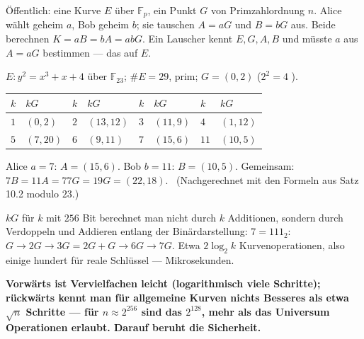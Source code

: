 \begin{merksatz}
Öffentlich: eine Kurve $E$ über $\mathbb F_p$, ein Punkt $G$ von Primzahlordnung $n$. Alice wählt geheim $a$, Bob geheim $b$; sie tauschen $A = aG$ und $B = bG$ aus. Beide berechnen $K = aB = bA = abG$. Ein Lauscher kennt $E, G, A, B$ und müsste $a$ aus $A = aG$ bestimmen --- das  auf $E$.

$E\colon y^{2} = x^{3} + x + 4$ über $\mathbb F_{23}$; $\#E = 29$, prim; $G = (0, 2)$ ($2^{2} = 4$ \checkmark).
\begin{center}
{\small
\renewcommand{\arraystretch}{1.46}
\begin{tabular}{@{}P{1.0cm}P{1.4cm}P{1.0cm}P{1.4cm}P{1.0cm}P{1.4cm}P{1.0cm}P{1.4cm}@{}}
\toprule
$k$ & $kG$ & $k$ & $kG$ & $k$ & $kG$ & $k$ & $kG$\\
\midrule
$1$ & $(0, 2)$ & $2$ & $(13, 12)$ & $3$ & $(11, 9)$ & $4$ & $(1, 12)$\\
$5$ & $(7, 20)$ & $6$ & $(9, 11)$ & $7$ & $(15, 6)$ & $11$ & $(10, 5)$\\
\bottomrule
\end{tabular}}
\end{center}
Alice $a = 7$: $A = (15, 6)$. Bob $b = 11$: $B = (10, 5)$. Gemeinsam: $7B = 11A = 77G = 19G = (22, 18)$. \checkmark\ (Nachgerechnet mit den Formeln aus Satz 10.2 modulo $23$.)

$kG$ für $k$ mit $256$ Bit berechnet man nicht durch $k$ Additionen, sondern durch Verdoppeln und Addieren entlang der Binärdarstellung: $7 = 111_2$: $G\to2G\to3G = 2G + G\to6G\to7G$. Etwa $2\log_2k$ Kurvenoperationen, also einige hundert für reale Schlüssel --- Mikrosekunden.

\begin{center}
\begin{minipage}{0.9\textwidth}
\textbf{Vorwärts ist Vervielfachen leicht (logarithmisch viele Schritte); rückwärts kennt man für allgemeine Kurven nichts Besseres als etwa $\sqrt n$ Schritte --- für $n\approx2^{256}$ sind das $2^{128}$, mehr als das Universum Operationen erlaubt. Darauf beruht die Sicherheit.}
\end{minipage}
\end{center}


\end{merksatz}
